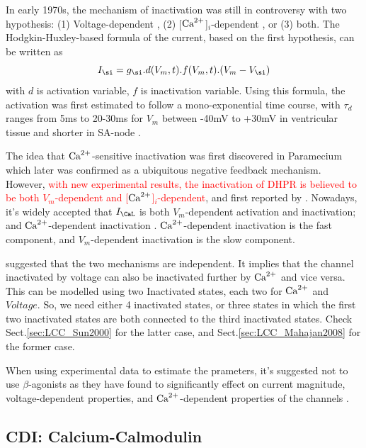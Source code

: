 In early 1970s, the mechanism of inactivation was still in controversy with two
hypothesis: (1) Voltage-dependent \citep{bassingthwaighte1972cme}, (2)
[${\text{Ca}^{2+}}$]$_i$-dependent \citep{linden1980,aronson1980}, or (3) both. 
The Hodgkin-Huxley-based formula of the current, based on the first
hypothesis, can be written as
\begin{equation}
I_\si = g_\si .d(V_m,t).f(V_m,t).(V_m-V_\si)
\end{equation}
with $d$ is activation variable, $f$ is inactivation variable. Using this
formula, the activation was first estimated to follow a mono-exponential time
course, with $\tau_d$ ranges from 5ms to 20-30ms for $V_m$ between -40mV to
+30mV in ventricular tissue \citep{reuter1973dcc} and shorter in SA-node
\citep{noma1980}. 

The idea that ${\text{Ca}^{2+}}$-sensitive inactivation was first discovered in Paramecium
\citep{brehm1978} which later was confirmed as a ubiquitous negative feedback
mechanism.  However, \textcolor{red}{with new experimental results, the
inactivation of DHPR is believed to be both $V_m$-dependent and
[${\text{Ca}^{2+}}$]$_i$-dependent}, and
  first reported by \citep{lee1985icc}.
Nowadays, it's widely accepted that $I_\CaL$ is both $V_m$-dependent activation
and inactivation; and ${\text{Ca}^{2+}}$-dependent inactivation \citep{mcdonald1994}.
${\text{Ca}^{2+}}$-dependent inactivation is the fast component, and $V_m$-dependent
inactivation is the slow component. 

\citep{hadley1991} suggested that the two mechanisms are independent. It implies
that the channel inactivated by voltage can also be inactivated further by ${\text{Ca}^{2+}}$
and vice versa. This can be modelled using two Inactivated states, each two for
${\text{Ca}^{2+}}$ and $Voltage$. So, we need either 4 inactivated states, or three states in
which the first two inactivated states are both connected to the third
inactivated states. Check Sect.\ref{sec:LCC_Sun2000} for the latter case, and
Sect.\ref{sec:LCC_Mahajan2008} for the former case.

When using experimental data to estimate the prameters, it's suggested not to
use $\beta$-agonists as they have found to significantly effect on current
magnitude, voltage-dependent properties, and ${\text{Ca}^{2+}}$-dependent properties of the
channels \citep{faber2007DHPR}.

\subsection{CDI: Calcium-Calmodulin}
\label{sec:CaCM}

